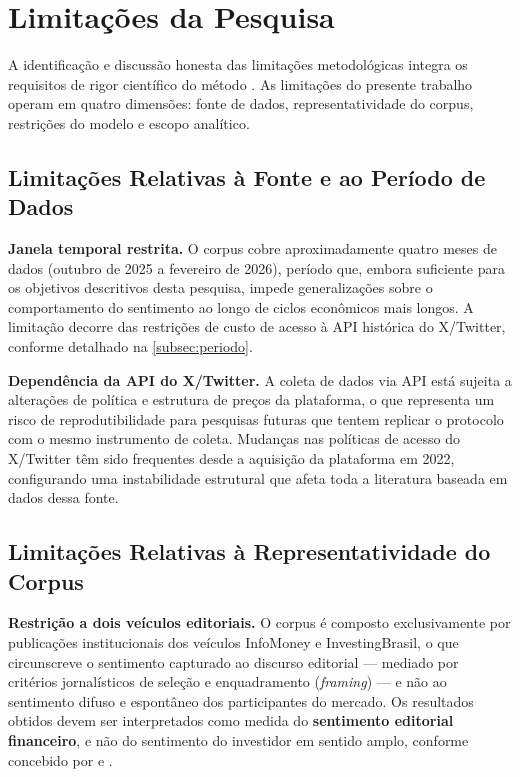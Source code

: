 
\section{Limitações da Pesquisa}
\label{sec:limitacoes}

A identificação e discussão honesta das limitações metodológicas integra os requisitos de rigor científico do método \cite{caseli2024cap1}. As limitações do presente trabalho operam em quatro dimensões: fonte de dados, representatividade do corpus, restrições do modelo e escopo analítico.

\subsection{Limitações Relativas à Fonte e ao Período de Dados}
\label{subsec:lim_fonte}

\textbf{Janela temporal restrita.} O corpus cobre aproximadamente quatro meses de dados (outubro de 2025 a fevereiro de 2026), período que, embora suficiente para os objetivos descritivos desta pesquisa, impede generalizações sobre o comportamento do sentimento ao longo de ciclos econômicos mais longos. A limitação decorre das restrições de custo de acesso à API histórica do X/Twitter, conforme detalhado na \autoref{subsec:periodo}.

\textbf{Dependência da API do X/Twitter.} A coleta de dados via API está sujeita a alterações de política e estrutura de preços da plataforma, o que representa um risco de reprodutibilidade para pesquisas futuras que tentem replicar o protocolo com o mesmo instrumento de coleta. Mudanças nas políticas de acesso do X/Twitter têm sido frequentes desde a aquisição da plataforma em 2022, configurando uma instabilidade estrutural que afeta toda a literatura baseada em dados dessa fonte.

\subsection{Limitações Relativas à Representatividade do Corpus}
\label{subsec:lim_representatividade}

\textbf{Restrição a dois veículos editoriais.} O corpus é composto exclusivamente por publicações institucionais dos veículos InfoMoney e InvestingBrasil, o que circunscreve o sentimento capturado ao discurso editorial --- mediado por critérios jornalísticos de seleção e enquadramento (\textit{framing}) --- e não ao sentimento difuso e espontâneo dos participantes do mercado. Os resultados obtidos devem ser interpretados como medida do \textbf{sentimento editorial financeiro}, e não do sentimento do investidor em sentido amplo, conforme concebido por  e .

